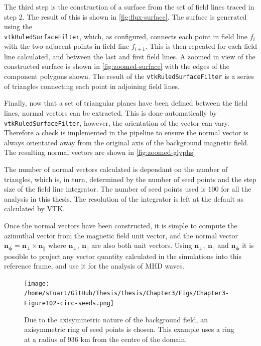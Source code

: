 \documentclass[a4paper,12pt,fourier,authoryear,custommargin]{Classes/PhDThesisPSnPDF}
\renewcommand{\vec}{\mathbf}
\begin{document}
The third step is the construction of a surface from the set of field lines traced in step 2.
The result of this is shown in \cref{fig:flux-surface}.
The surface is generated using the \\ \verb|vtkRuledSurfaceFilter|, which, as configured, connects each point in field line $f_i$ with the two adjacent points in field line $f_{i+1}$.
This is then repeated for each field line calculated, and between the last and first field lines.
A zoomed in view of the constructed surface is shown in \cref{fig:zoomed-surface} with the edges of the component polygons shown.
The result of the \verb|vtkRuledSurfaceFilter| is a series of triangles connecting each point in adjoining field lines.

Finally, now that a set of triangular planes have been defined between the field lines, normal vectors can be extracted.
This is done automatically by\\ \verb|vtkRuledSurfaceFilter|, however, the orientation of the vector can vary.
Therefore a check is implemented in the pipeline to ensure the normal vector is always orientated away from the original axis of the background magnetic field.
The resulting normal vectors are shown in \cref{fig:zoomed-glyphs}

The number of normal vectors calculated is dependant on the number of triangles, which is, in turn, determined by the number of seed points and the step size of the field line integrator.
The number of seed points used is $100$ for all the analysis in this thesis.
The resolution of the integrator is left at the default as calculated by VTK.

Once the normal vectors have been constructed, it is simple to compute the azimuthal vector from the magnetic field unit vector, and the normal vector $\vec{n_\phi}= \vec{n_\perp} \times \vec{n_\parallel}$ where $\vec{n_\perp},\ \vec{n_\parallel} $ are also both unit vectors.
Using  $\vec{n_\perp},\ \vec{n_\parallel}$ and $\vec{n_\phi}$ it  is possible to project any vector quantity calculated in the simulations into this reference frame, and use it for the analysis of MHD waves.



\begin{figure}[H]
    \centering
    \texttt{[image: /home/stuart/GitHub/Thesis/thesis/Chapter3/Figs/Chapter3-Figure102-circ-seeds.png]}
    \caption{Due to the axisymmetric nature of the background field, an axisymmetric ring of seed points is chosen. This example uses a ring at a radius of $936$ km from the centre of the domain.}
    \label{fig:circ-seeds}
\end{figure}
\end{document}
